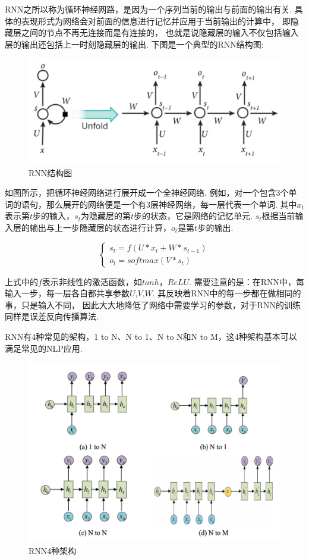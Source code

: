 \documentclass[bachelor,winfonts]{jnuthesis}
\begin{document}
RNN之所以称为循环神经网路，是因为一个序列当前的输出与前面的输出有关.
具体的表现形式为网络会对前面的信息进行记忆并应用于当前输出的计算中，
即隐藏层之间的节点不再无连接而是有连接的，
也就是说隐藏层的输入不仅包括输入层的输出还包括上一时刻隐藏层的输出.
下图是一个典型的RNN结构图:

\begin{figure}[h!]
  \centering
  \includegraphics[width=0.6\linewidth]{RNN.png}
  \caption{RNN结构图}
\end{figure}

如图所示，把循环神经网络进行展开成一个全神经网络.
例如，对一个包含3个单词的语句，那么展开的网络便是一个有3层神经网络，每一层代表一个单词.
其中$x_{t}$表示第$t$步的输入，$s_{t}$为隐藏层的第$t$步的状态，它是网络的记忆单元.
$s_{t}$根据当前输入层的输出与上一步隐藏层的状态进行计算，$o_{t}$是第t步的输出.

\begin{equation}
  \left\{
  \begin{array}{l}
    s_{t} = f(U*x_{t}+W*s_{t-1}) \\
    o_{t} = softmax(V*s_{t})
  \end{array}
  \right.
\end{equation}

上式中的$f$表示非线性的激活函数，如$tanh$，$ReLU$.
需要注意的是：在RNN中，每输入一步，每一层各自都共享参数$U$,$V$,$W$.
其反映着RNN中的每一步都在做相同的事，只是输入不同，
因此大大地降低了网络中需要学习的参数，对于RNN的训练同样是误差反向传播算法.

RNN有4种常见的架构，1 to N、N to 1、N to N和N to M，这4种架构基本可以满足常见的NLP应用.

\begin{figure}[h!]
  \centering
  \includegraphics[width=0.65\linewidth]{4种架构.png}
  \caption{RNN4种架构}
\end{figure}
\end{document}
